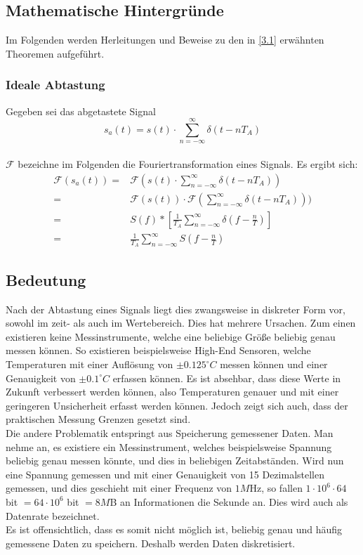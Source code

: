 \subsection{Mathematische Hintergründe}\label{3.2}
Im Folgenden werden Herleitungen und Beweise zu den in \ref{3.1} erwähnten Theoremen aufgeführt.

\subsubsection{Ideale Abtastung}
Gegeben sei das abgetastete Signal\\
$$s_a(t) = s(t) \cdot \sum_{n=-\infty}^{\infty} \delta(t - nT_A)$$\\
$\mathcal{F}$ bezeichne im Folgenden die Fouriertransformation eines Signals. Es ergibt sich:\\
\begin{equation}
\begin{aligned}
\mathcal{F}(s_a(t)) = &  \mathcal{F}(s(t) \cdot \sum\limits_{n=-\infty}^{\infty} \delta(t - nT_A)) \\
= & \mathcal{F}(s(t)) \cdot \mathcal{F}(\sum\limits_{n=-\infty}^{\infty} \delta(t - nT_A))) \\
= & S(f) * \left[ \frac{1}{T_A} \sum_{n = -\infty} ^ {\infty} \delta \left( f - \frac{n}{T} \right) \right] \\
= & \frac{1}{T_A} \sum_{n = -\infty} ^ {\infty} S\left( f - \frac{n}{T} \right)
\end{aligned}
\end{equation}


\subsection{Bedeutung}\label{3.3}

Nach der Abtastung eines Signals liegt dies zwangsweise in diskreter Form vor, sowohl im zeit- als auch im Wertebereich. Dies hat mehrere Ursachen. Zum einen existieren keine Messinstrumente, welche eine beliebige Größe beliebig genau messen können. So existieren beispielsweise High-End Sensoren, welche Temperaturen mit einer Auflösung von $\pm0.125^\circ C$ messen können und einer Genauigkeit von $\pm0.1^\circ C$ erfassen können. Es ist absehbar, dass diese Werte in Zukunft verbessert werden können, also Temperaturen genauer und mit einer geringeren Unsicherheit erfasst werden können. Jedoch zeigt sich auch, dass der praktischen Messung Grenzen gesetzt sind.\\
Die andere Problematik entspringt aus Speicherung gemessener Daten. Man nehme an, es existiere ein Messinstrument, welches beispielsweise Spannung beliebig genau messen könnte, und dies in beliebigen Zeitabständen. Wird nun eine Spannung gemessen und mit einer Genauigkeit von 15 Dezimalstellen gemessen, und dies geschieht mit einer Frequenz von $1M$Hz, so fallen $1 \cdot 10^6 \cdot 64$ bit $= 64 \cdot 10^6$ bit $= 8M$B an Informationen die Sekunde an. Dies wird auch als Datenrate bezeichnet.\\
Es ist offensichtlich, dass es somit nicht möglich ist, beliebig genau und häufig gemessene Daten zu speichern. Deshalb werden Daten diskretisiert.\\

